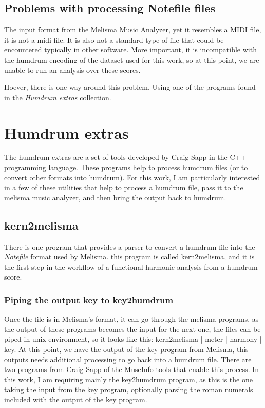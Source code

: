   \subsection{Problems with processing Notefile files}
    The input format from the Melisma Music Analyzer, yet it resembles a MIDI file, it is not a midi file. It is also not a standard type of file that could be encountered typically in other software. More important, it is incompatible with the humdrum encoding of the dataset used for this work, so at this point, we are unable to run an analysis over these scores.

    Hoever, there is one way around this problem. Using one of the programs found in the \emph{Humdrum extras} collection.

\section{Humdrum extras}
  The humdrum extras are a set of tools developed by Craig Sapp in the C++ programming language. These programs help to process humdrum files (or to convert other formats into humdrum). For this work, I am particularly interested in a few of these utilities that help to process a humdrum file, pass it to the melisma music analyzer, and then bring the output back to humdrum.

  \subsection{kern2melisma}
    There is one program that provides a parser to convert a humdrum file into the \emph{Notefile} format used by Melisma. this program is called kern2melisma, and it is the first step in the workflow of a functional harmonic analysis from a humdrum score.

  \subsubsection{Piping the output key to key2humdrum}
    Once the file is in Melisma's format, it can go through the melisma programs, as the output of these programs becomes the input for the next one, the files can be piped in unix environment, so it looks like this: kern2melisma | meter | harmony | key.
    At this point, we have the output of the key program from Melisma, this outputs needs additional processing to go back into a humdrum file. There are two programs from Craig Sapp of the MuseInfo tools that enable this process. In this work, I am requiring mainly the key2humdrum program, as this is the one taking the input from the key program, optionally parsing the roman numerals included with the output of the key program.
